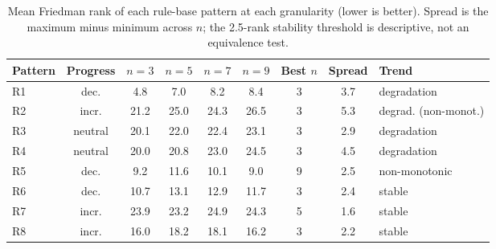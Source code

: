 \begin{table}[H]
\centering
\small
\caption{Mean Friedman rank of each rule-base pattern at each granularity (lower is better). Spread is the maximum minus minimum across $n$; the 2.5-rank stability threshold is descriptive, not an equivalence test.}
\label{tab:granularity_by_rule}
\setlength{\tabcolsep}{3.5pt}
\begin{tabular}{lcccccccl}
\toprule
\textbf{Pattern} & \textbf{Progress} & \boldmath$n=3$ & \boldmath$n=5$ & \boldmath$n=7$ & \boldmath$n=9$ & \textbf{Best} \boldmath$n$ & \textbf{Spread} & \textbf{Trend} \\
\midrule
R1 & dec. & 4.8 & 7.0 & 8.2 & 8.4 & 3 & 3.7 & degradation \\
R2 & incr. & 21.2 & 25.0 & 24.3 & 26.5 & 3 & 5.3 & degrad. (non-monot.) \\
R3 & neutral & 20.1 & 22.0 & 22.4 & 23.1 & 3 & 2.9 & degradation \\
R4 & neutral & 20.0 & 20.8 & 23.0 & 24.5 & 3 & 4.5 & degradation \\
R5 & dec. & 9.2 & 11.6 & 10.1 & 9.0 & 9 & 2.5 & non-monotonic \\
R6 & dec. & 10.7 & 13.1 & 12.9 & 11.7 & 3 & 2.4 & stable \\
R7 & incr. & 23.9 & 23.2 & 24.9 & 24.3 & 5 & 1.6 & stable \\
R8 & incr. & 16.0 & 18.2 & 18.1 & 16.2 & 3 & 2.2 & stable \\
\bottomrule
\end{tabular}
\end{table}
